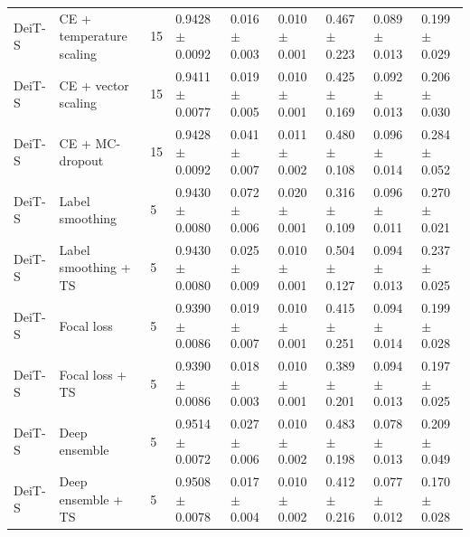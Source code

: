 \begin{table}[ht]
\begin{tabular}{lllllllll}
DeiT-S & CE + temperature scaling & 15 & 0.9428 $\pm$ 0.0092 & 0.016 $\pm$ 0.003 & 0.010 $\pm$ 0.001 & 0.467 $\pm$ 0.223 & 0.089 $\pm$ 0.013 & 0.199 $\pm$ 0.029 \\
DeiT-S & CE + vector scaling & 15 & 0.9411 $\pm$ 0.0077 & 0.019 $\pm$ 0.005 & 0.010 $\pm$ 0.001 & 0.425 $\pm$ 0.169 & 0.092 $\pm$ 0.013 & 0.206 $\pm$ 0.030 \\
DeiT-S & CE + MC-dropout & 15 & 0.9428 $\pm$ 0.0092 & 0.041 $\pm$ 0.007 & 0.011 $\pm$ 0.002 & 0.480 $\pm$ 0.108 & 0.096 $\pm$ 0.014 & 0.284 $\pm$ 0.052 \\
DeiT-S & Label smoothing & 5 & 0.9430 $\pm$ 0.0080 & 0.072 $\pm$ 0.006 & 0.020 $\pm$ 0.001 & 0.316 $\pm$ 0.109 & 0.096 $\pm$ 0.011 & 0.270 $\pm$ 0.021 \\
DeiT-S & Label smoothing + TS & 5 & 0.9430 $\pm$ 0.0080 & 0.025 $\pm$ 0.009 & 0.010 $\pm$ 0.001 & 0.504 $\pm$ 0.127 & 0.094 $\pm$ 0.013 & 0.237 $\pm$ 0.025 \\
DeiT-S & Focal loss & 5 & 0.9390 $\pm$ 0.0086 & 0.019 $\pm$ 0.007 & 0.010 $\pm$ 0.001 & 0.415 $\pm$ 0.251 & 0.094 $\pm$ 0.014 & 0.199 $\pm$ 0.028 \\
DeiT-S & Focal loss + TS & 5 & 0.9390 $\pm$ 0.0086 & 0.018 $\pm$ 0.003 & 0.010 $\pm$ 0.001 & 0.389 $\pm$ 0.201 & 0.094 $\pm$ 0.013 & 0.197 $\pm$ 0.025 \\
DeiT-S & Deep ensemble & 5 & 0.9514 $\pm$ 0.0072 & 0.027 $\pm$ 0.006 & 0.010 $\pm$ 0.002 & 0.483 $\pm$ 0.198 & 0.078 $\pm$ 0.013 & 0.209 $\pm$ 0.049 \\
DeiT-S & Deep ensemble + TS & 5 & 0.9508 $\pm$ 0.0078 & 0.017 $\pm$ 0.004 & 0.010 $\pm$ 0.002 & 0.412 $\pm$ 0.216 & 0.077 $\pm$ 0.012 & 0.170 $\pm$ 0.028 \\
\hline
\end{tabular}
\end{table}